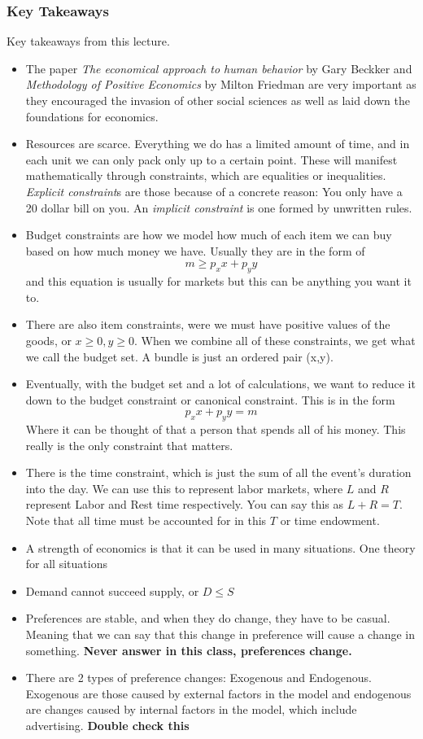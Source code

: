 \documentclass{article}
\begin{document}
\subsubsection{Key Takeaways}
Key takeaways from this lecture. 
\begin{itemize}
    \item The paper \textit{The economical approach to human behavior} by Gary Beckker and \textit{Methodology of Positive Economics} by Milton Friedman are very important as they encouraged the invasion of other social sciences as well as laid down the foundations for economics.
    \item Resources are scarce. Everything we do has a limited amount of time, and in each unit we can only pack only up to a certain point. These will manifest mathematically through constraints, which are equalities or inequalities. \textit{Explicit constraint}s are those because of a concrete reason: You only have a 20 dollar bill on you. An \textit{implicit constraint} is one formed by unwritten rules.
    \item Budget constraints are how we model how much of each item we can buy based on how much money we have. Usually they are in the form of 
    \[
    m \geq p_x x + p_y y
    \]
    and this equation is usually for markets but this can be anything you want it to.
    \item There are also item constraints, were we must have positive values of the goods, or \(x \geq 0, y \geq 0\). When we combine all of these constraints, we get what we call the budget set. A bundle is just an ordered pair (x,y). 
    \item Eventually, with the budget set and a lot of calculations, we want to reduce it down to the budget constraint or canonical constraint. This is in the form 
    \[
    p_x x + p_y y = m
    \]
    Where it can be thought of that a person that spends all of his money. This really is the only constraint that matters.
    \item There is the time constraint, which is just the sum of all the event's duration into the day. We can use this to represent labor markets, where $L$ and $R$ represent Labor and Rest time respectively. You can say this as $L + R = T$. Note that all time must be accounted for in this $T$ or time endowment. 
    \item A strength of economics is that it can be used in many situations. One theory for all situations
    \item Demand cannot succeed supply, or $D \leq S$
    \item Preferences are stable, and when they do change, they have to be casual. Meaning that we can say that this change in preference will cause a change in something. \textbf{Never answer in this class, preferences change.}
    \item There are 2 types of preference changes: Exogenous and Endogenous. Exogenous are those caused by external factors in the model and endogenous are changes caused by internal factors in the model, which include advertising. \textbf{Double check this}
    
\end{itemize}
\end{document}
